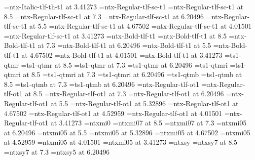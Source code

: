\font\threeivsl=ntx-Italic-tlf-th-t1 at 3.41273\Unit%
\font\tensc=ntx-Regular-tlf-sc-t1%
\font\ninesc=ntx-Regular-tlf-sc-t1 at 8.5\Unit%
\font\sevensc=ntx-Regular-tlf-sc-t1 at 7.3\Unit%
\font\sixsc=ntx-Regular-tlf-sc-t1 at 6.20496\Unit%
\font\fivevsc=ntx-Regular-tlf-sc-t1 at 5.5\Unit%
\font\fourvisc=ntx-Regular-tlf-sc-t1 at 4.67502\Unit%
\font\foursc=ntx-Regular-tlf-sc-t1 at 4.01501\Unit%
\font\threeivsc=ntx-Regular-tlf-sc-t1 at 3.41273\Unit%
\font\tenbf=ntx-Bold-tlf-t1%
\font\ninebf=ntx-Bold-tlf-t1 at 8.5\Unit%
\font\sevenbf=ntx-Bold-tlf-t1 at 7.3\Unit%
\font\sixbf=ntx-Bold-tlf-t1 at 6.20496\Unit%
\font\fivevbf=ntx-Bold-tlf-t1 at 5.5\Unit%
\font\fourvibf=ntx-Bold-tlf-t1 at 4.67502\Unit%
\font\fourbf=ntx-Bold-tlf-t1 at 4.01501\Unit%
\font\threeivbf=ntx-Bold-tlf-t1 at 3.41273\Unit%
\font\tentsr=ts1-qtmr%
\font\ninetsr=ts1-qtmr at 8.5\Unit%
\font\seventsr=ts1-qtmr at 7.3\Unit%
\font\sixtsr=ts1-qtmr at 6.20496\Unit%
\font\tentsi=ts1-qtmri%
\font\ninetsi=ts1-qtmri at 8.5\Unit%
\font\seventsi=ts1-qtmri at 7.3\Unit%
\font\sixtsi=ts1-qtmri at 6.20496\Unit%
\font\tentsb=ts1-qtmb%
\font\ninetsb=ts1-qtmb at 8.5\Unit%
\font\seventsb=ts1-qtmb at 7.3\Unit%
\font\sixtsb=ts1-qtmb at 6.20496\Unit%
\font\tenrmm=ntx-Regular-tlf-ot1%
\font\ninermm=ntx-Regular-tlf-ot1 at 8.5\Unit%
\font\sevenrmm=ntx-Regular-tlf-ot1 at 7.3\Unit%
\font\sixrmm=ntx-Regular-tlf-ot1 at 6.20496\Unit%
\font\fivevrmm=ntx-Regular-tlf-ot1 at 5.5\Unit%
\font\fivermm=ntx-Regular-tlf-ot1 at 5.32896\Unit%
\font\fourvirmm=ntx-Regular-tlf-ot1 at 4.67502\Unit%
\font\fourvrmm=ntx-Regular-tlf-ot1 at 4.52959\Unit%
\font\fourrmm=ntx-Regular-tlf-ot1 at 4.01501\Unit%
\font\threeivrmm=ntx-Regular-tlf-ot1 at 3.41273\Unit%
\font\teni=ntxmi0%
\skewchar{}%
\font\ninei=ntxmi07 at 8.5\Unit%
\skewchar{}%
\font\seveni=ntxmi07 at 7.3\Unit%
\skewchar{}%
\font\sixi=ntxmi05 at 6.20496\Unit%
\skewchar{}%
\font\fivevi=ntxmi05 at 5.5\Unit%
\skewchar{}%
\font\fivei=ntxmi05 at 5.32896\Unit%
\skewchar{}%
\font\fourvii=ntxmi05 at 4.67502\Unit%
\skewchar{}%
\font\fourvi=ntxmi05 at 4.52959\Unit%
\skewchar{}%
\font\fouri=ntxmi05 at 4.01501\Unit%
\skewchar{}%
\font\threeivi=ntxmi05 at 3.41273\Unit%
\skewchar{}%
\font\tensy=ntxsy%
\skewchar{}%
\font\ninesy=ntxsy7 at 8.5\Unit%
\skewchar{}%
\font\sevensy=ntxsy7 at 7.3\Unit%
\skewchar{}%
\font\sixsy=ntxsy5 at 6.20496\Unit%
